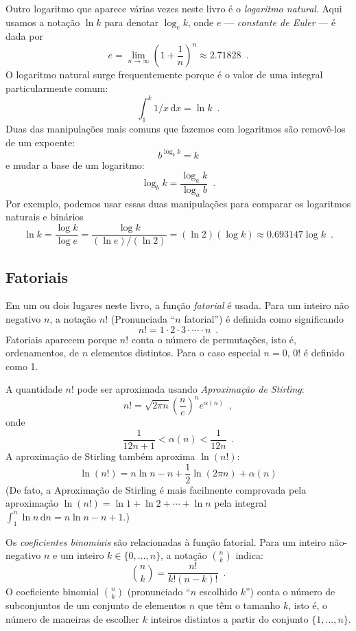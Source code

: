 %
%
Outro logaritmo que aparece várias vezes neste livro é o \emph{logaritmo
	natural}. 
Aqui usamos a notação $\ln k$ para denotar $\log_e k$, onde $e$ ---
\emph{constante de Euler} --- é dada por
%
%
\[
e = \lim_{n\rightarrow\infty} \left(1+\frac{1}{n}\right)^n
\approx  2.71828 \enspace .
\]
O logaritmo natural surge frequentemente porque é o valor de uma 
integral particularmente comum:
\[
\int_{1}^{k} 1/x\,\mathrm{d}x  = \ln k \enspace .
\]
Duas das manipulações mais comuns que fazemos com logaritmos são removê-los de
um expoente:
\[
b^{\log_b k} = k
\]
e mudar a base de um logaritmo:
\[
\log_b k = \frac{\log_a k}{\log_a b} \enspace .
\]
Por exemplo, podemos usar essas duas manipulações para comparar os logaritmos
naturais e binários
\[
\ln k = \frac{\log k}{\log e} = \frac{\log k}{(\ln e)/(\ln 2)} = 
(\ln 2)(\log k) \approx 0.693147\log k \enspace .
\]

\subsection{Fatoriais}

%
Em um ou dois lugares neste livro, a função \emph{fatorial} é usada.
Para um inteiro não negativo $n$, a notação $n!$ (Pronunciada ``$n$ fatorial'')
é definida como significando
\[
n! = 1\cdot2\cdot3\cdot\cdots\cdot n \enspace .
\]
Fatoriais aparecem porque $n!$ conta o número de
permutações, isto é, ordenamentos, de $n$ elementos distintos.
%
Para o caso especial $n=0$, $0!$ é definido como 1.

%
A quantidade $n!$ pode ser aproximada usando \emph{Aproximação de Stirling}:
\[
n! 
= \sqrt{2\pi n}\left(\frac{n}{e}\right)^{n}e^{\alpha(n)} \enspace ,
\]
onde
\[  
\frac{1}{12n+1} <  \alpha(n) < \frac{1}{12n}  \enspace .
\]
A aproximação de Stirling também aproxima $\ln(n!)$:
\[
\ln(n!) = n\ln n - n + \frac{1}{2}\ln(2\pi n) + \alpha(n)
\]
(De fato, a Aproximação de Stirling é mais facilmente comprovada pela
aproximação
$\ln(n!)=\ln 1 + \ln 2  + \cdots + \ln n$ pela integral
$\int_1^n \ln n\,\mathrm{d}n = n\ln n - n +1$.)

%
Os \emph{coeficientes binomiais} são relacionadas à função fatorial.
Para um inteiro não-negativo $n$ e um inteiro $k\in\{0,\ldots,n\}$,
a notação $\binom{n}{k}$ indica:
\[
\binom{n}{k} = \frac{n!}{k!(n-k)!} \enspace .
\]
O coeficiente binomial $\binom{n}{k}$ (pronunciado ``$n$ escolhido $k$'')
conta o número de subconjuntos de um conjunto de elementos $n$ que têm o tamanho
$k$,
isto é, o número de maneiras de escolher $k$ inteiros distintos a partir do
conjunto $\{1,\ldots,n\}$.

